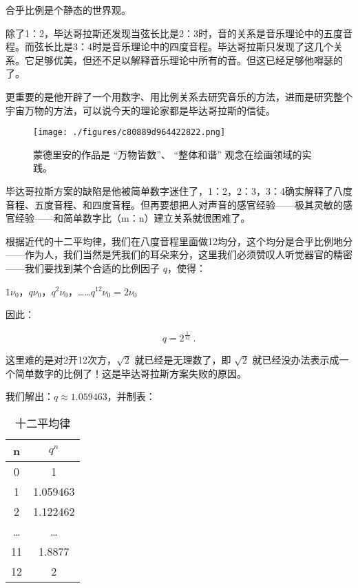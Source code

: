 合乎比例是个静态的世界观。

除了1：2，毕达哥拉斯还发现当弦长比是2：3时，音的关系是音乐理论中的五度音程。而弦长比是3：4时是音乐理论中的四度音程。毕达哥拉斯只发现了这几个关系。它足够优美，但还不足以解释音乐理论中所有的音。但这已经足够他嘚瑟的了。

更重要的是他开辟了一个用数字、用比例关系去研究音乐的方法，进而是研究整个宇宙万物的方法，可以说今天的理论家都是毕达哥拉斯的信徒。

\begin{figure}[ht]
\centering
\texttt{[image: ./figures/c80889d964422822.png]}
\caption{蒙德里安的作品是 “万物皆数”、 “整体和谐” 观念在绘画领域的实践。} \label{fig_ClBohr_3}
\end{figure}

毕达哥拉斯方案的缺陷是他被简单数字迷住了，1：2，2：3，3：4确实解释了八度音程、五度音程、和四度音程。但再要想把人对声音的感官经验——极其灵敏的感官经验——和简单数字比（m：n）建立关系就很困难了。

根据近代的十二平均律，我们在八度音程里面做12均分，这个均分是合乎比例地分——作为人，我们当然是凭我们的耳朵来分，这里我们必须赞叹人听觉器官的精密——我们要找到某个合适的比例因子 $q$，使得：

$1 \nu_0$，$q \nu_0$，$q^2 \nu_0$，……$q^{12} \nu_0 =2 \nu_0$

因此：

\begin{equation}
q = 2^{\frac{1}{12}}~.
\end{equation}

这里难的是对2开12次方，$\sqrt{2}$ 就已经是无理数了，即 $\sqrt{2}$ 就已经没办法表示成一个简单数字的比例了！这是毕达哥拉斯方案失败的原因。

我们解出：$q \approx 1.059463 $，并制表：

\begin{table}[ht]
\centering
\caption{⼗⼆平均律}\label{tab_ClBohr_1}
\begin{tabular}{|c|c|}
\hline
n & $q^n$\\
\hline
0 & 1 \\
\hline
1& 1.059463 \\
\hline
2 & 1.122462 \\
\hline
… & … \\
\hline
11 & 1.8877 \\
\hline
12 & 2 \\
\hline
\end{tabular}
\end{table}


